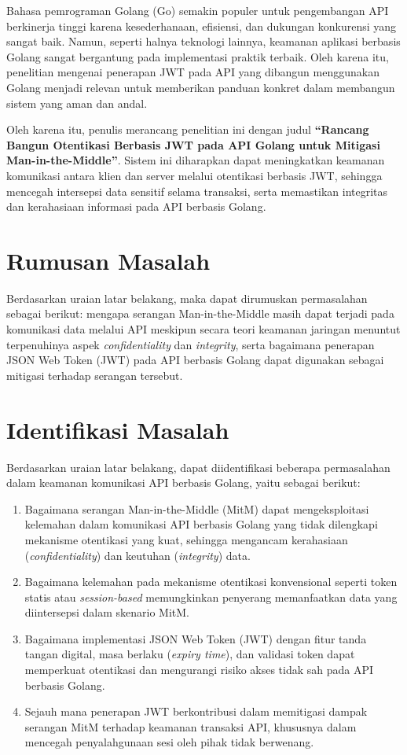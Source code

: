 Bahasa pemrograman Golang (Go) semakin populer untuk pengembangan API berkinerja tinggi karena kesederhanaan, efisiensi, dan dukungan konkurensi yang sangat baik. Namun, seperti halnya teknologi lainnya, keamanan aplikasi berbasis Golang sangat bergantung pada implementasi praktik terbaik. Oleh karena itu, penelitian mengenai penerapan JWT pada API yang dibangun menggunakan Golang menjadi relevan untuk memberikan panduan konkret dalam membangun sistem yang aman dan andal.

Oleh karena itu, penulis merancang penelitian ini dengan judul \textbf{``Rancang Bangun Otentikasi Berbasis JWT pada API Golang untuk Mitigasi Man-in-the-Middle''}. Sistem ini diharapkan dapat meningkatkan keamanan komunikasi antara klien dan server melalui otentikasi berbasis JWT, sehingga mencegah intersepsi data sensitif selama transaksi, serta memastikan integritas dan kerahasiaan informasi pada API berbasis Golang.

\section{Rumusan Masalah}

Berdasarkan uraian latar belakang, maka dapat dirumuskan permasalahan sebagai berikut: mengapa serangan Man-in-the-Middle masih dapat terjadi pada komunikasi data melalui API meskipun secara teori keamanan jaringan menuntut terpenuhinya aspek \textit{confidentiality} dan \textit{integrity}, serta bagaimana penerapan JSON Web Token (JWT) pada API berbasis Golang dapat digunakan sebagai mitigasi terhadap serangan tersebut.

\section{Identifikasi Masalah}

Berdasarkan uraian latar belakang, dapat diidentifikasi beberapa permasalahan dalam keamanan komunikasi API berbasis Golang, yaitu sebagai berikut:
\begin{enumerate}
  \item Bagaimana serangan Man-in-the-Middle (MitM) dapat mengeksploitasi kelemahan dalam komunikasi API berbasis Golang yang tidak dilengkapi mekanisme otentikasi yang kuat, sehingga mengancam kerahasiaan (\textit{confidentiality}) dan keutuhan (\textit{integrity}) data.
  \item Bagaimana kelemahan pada mekanisme otentikasi konvensional seperti token statis atau \textit{session-based} memungkinkan penyerang memanfaatkan data yang diintersepsi dalam skenario MitM.
  \item Bagaimana implementasi JSON Web Token (JWT) dengan fitur tanda tangan digital, masa berlaku (\textit{expiry time}), dan validasi token dapat memperkuat otentikasi dan mengurangi risiko akses tidak sah pada API berbasis Golang.
  \item Sejauh mana penerapan JWT berkontribusi dalam memitigasi dampak serangan MitM terhadap keamanan transaksi API, khususnya dalam mencegah penyalahgunaan sesi oleh pihak tidak berwenang.
\end{enumerate}

